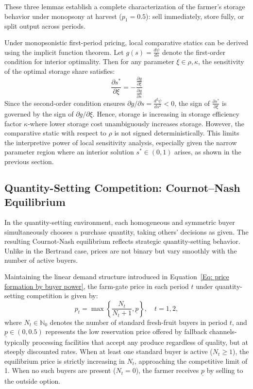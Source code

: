 These three lemmas establish a complete characterization of the farmer's storage behavior under monopsony at harvest ($p_1 = 0.5$): sell immediately, store fully, or split output across periods.  

Under monopsonistic first-period pricing, local comparative statics can be derived using the implicit function theorem. Let $g(s) = \frac{d\psi}{ds}$ denote the first-order condition for interior optimality. Then for any parameter $\xi \in {\rho, \kappa}$, the sensitivity of the optimal storage share satisfies:
$$
\frac{\partial s^*}{\partial \xi}= -\frac{\frac{\partial g}{\partial \xi}}{\frac{\partial g}{\partial s}}
$$
Since the second-order condition ensures $\partial g / \partial s = \frac{d^2\psi}{ds^2} < 0$, the sign of $\frac{\partial s^*}{\partial \xi}$ is governed by the sign of $\partial g / \partial \xi$. Hence, storage is increasing in storage efficiency factor $\kappa$-where lower storage cost unambiguously increases storage. However, the comparative static with respect to $\rho$ is not signed deterministically. This limits the interpretive power of local sensitivity analysis, especially given the narrow parameter region where an interior solution $s^* \in (0,1)$ arises, as shown in the previous section.







\subsection{Quantity-Setting Competition: Cournot--Nash Equilibrium}
\noindent In the quantity-setting environment, each homogeneous and symmetric buyer simultaneously chooses a purchase quantity, taking others' decisions as given. The resulting Cournot-Nash equilibrium reflects strategic quantity-setting behavior. Unlike in the Bertrand case, prices are not binary but vary smoothly with the number of active buyers.

Maintaining the linear demand structure introduced in Equation~\ref{Eq: price formation by buyer power}, the farm-gate price in each period $t$ under quantity-setting competition is given by:
\begin{equation}
p_t = \max\left\{\frac{N_t}{N_t + 1}, \underline{p} \right\}, \quad t = 1,2,
\end{equation}
where $N_t \in \mathbb{N}_0$ denotes the number of standard fresh-fruit buyers in period $t$, and $\underline{p} \in (0,0.5)$ represents the low reservation price offered by fallback channels-typically processing facilities that accept any produce regardless of quality, but at steeply discounted rates. When at least one standard buyer is active ($N_t \geq 1$), the equilibrium price is strictly increasing in $N_t$, approaching the competitive limit of 1. When no such buyers are present ($N_t = 0$), the farmer receives $\underline{p}$ by selling to the outside option.

